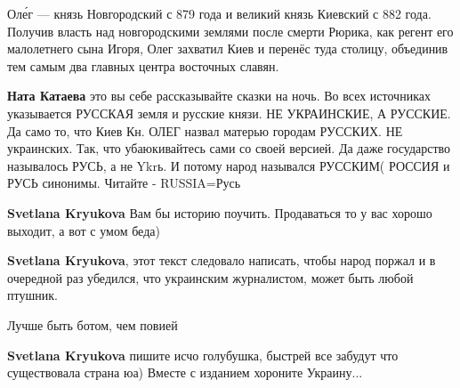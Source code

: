 \begin{itemize}
\begin{itemize}
Оле́г — князь Новгородский с 879 года и великий князь Киевский с 882 года.
Получив власть над новгородскими землями после смерти Рюрика, как регент его
малолетнего сына Игоря, Олег захватил Киев и перенёс туда столицу, объединив
тем самым два главных центра восточных славян.

 
\textbf{Ната Катаева} это вы себе рассказывайте сказки на ночь. Во всех источниках указывается РУССКАЯ земля и русские князи. НЕ УКРАИНСКИЕ, А РУССКИЕ. Да само то, что Киев Кн. ОЛЕГ назвал матерью городам РУССКИХ. НЕ украинских. Так, что убаюкивайтесь сами со своей версией. Да даже государство называлось РУСЬ, а не Ykrь. И потому народ назывался РУССКИМ( РОССИЯ и РУСЬ синонимы. Читайте - RUSSIA=Русь

 
\textbf{Svetlana Kryukova} Вам бы историю поучить. Продаваться то у вас хорошо выходит, а вот с умом беда)

 
\textbf{Svetlana Kryukova}, этот текст следовало написать, чтобы народ поржал и
в очередной раз убедился, что украинским журналистом, может быть любой птушник.

 
Лучше быть ботом, чем повией

 
\textbf{Svetlana Kryukova} пишите исчо голубушка, быстрей все забудут что существовала страна юа) Вместе с изданием хороните Украину...

\end{itemize}

\end{itemize}

